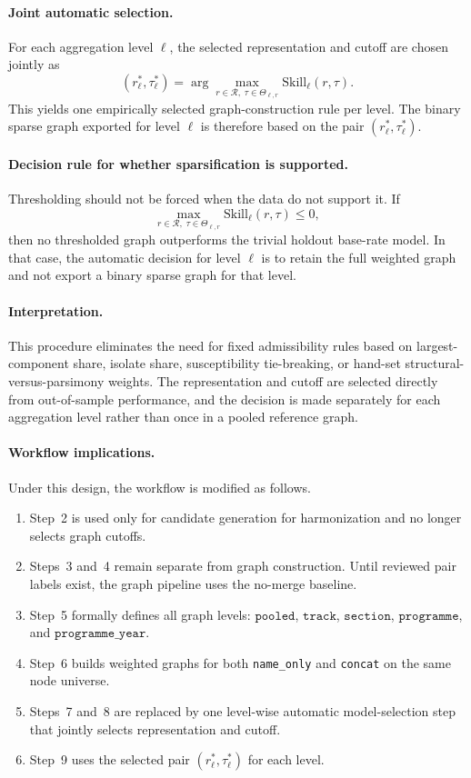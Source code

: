 \paragraph{Joint automatic selection.}
For each aggregation level \(\ell\), the selected representation and cutoff are chosen jointly as
\[
(r_{\ell}^{*},\tau_{\ell}^{*})
=
\arg\max_{r \in \mathcal{R},\;\tau \in \Theta_{\ell,r}}
\mathrm{Skill}_{\ell}(r,\tau).
\]
This yields one empirically selected graph-construction rule per level. The binary sparse graph
exported for level \(\ell\) is therefore based on the pair
\((r_{\ell}^{*},\tau_{\ell}^{*})\).

\paragraph{Decision rule for whether sparsification is supported.}
Thresholding should not be forced when the data do not support it. If
\[
\max_{r \in \mathcal{R},\;\tau \in \Theta_{\ell,r}}
\mathrm{Skill}_{\ell}(r,\tau)
\le 0,
\]
then no thresholded graph outperforms the trivial holdout base-rate model. In that case, the
automatic decision for level \(\ell\) is to retain the full weighted graph and not export a binary
sparse graph for that level.

\paragraph{Interpretation.}
This procedure eliminates the need for fixed admissibility rules based on largest-component share,
isolate share, susceptibility tie-breaking, or hand-set structural-versus-parsimony weights. The
representation and cutoff are selected directly from out-of-sample performance, and the decision
is made separately for each aggregation level rather than once in a pooled reference graph.

\paragraph{Workflow implications.}
Under this design, the workflow is modified as follows.
\begin{enumerate}
    \item Step~2 is used only for candidate generation for harmonization and no longer selects
    graph cutoffs.
    \item Steps~3 and~4 remain separate from graph construction. Until reviewed pair labels
    exist, the graph pipeline uses the no-merge baseline.
    \item Step~5 formally defines all graph levels:
    \(\texttt{pooled}\), \(\texttt{track}\), \(\texttt{section}\),
    \(\texttt{programme}\), and \(\texttt{programme\_year}\).
    \item Step~6 builds weighted graphs for both \texttt{name\_only} and \texttt{concat}
    on the same node universe.
    \item Steps~7 and~8 are replaced by one level-wise automatic model-selection step that
    jointly selects representation and cutoff.
    \item Step~9 uses the selected pair \((r_{\ell}^{*},\tau_{\ell}^{*})\) for each level.
\end{enumerate}

